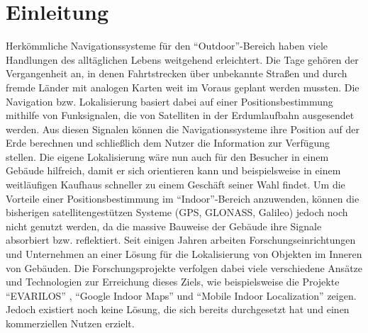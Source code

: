 \chapter{Einleitung}
Herkömmliche Navigationssysteme für den "`Outdoor"'-Bereich haben viele Handlungen des alltäglichen Lebens weitgehend erleichtert. Die Tage gehören der Vergangenheit an, in denen Fahrtstrecken über unbekannte Straßen und durch fremde Länder mit analogen Karten weit im Voraus geplant werden mussten. Die Navigation bzw. Lokalisierung basiert dabei auf einer Positionsbestimmung mithilfe von Funksignalen, die von Satelliten in der Erdumlaufbahn ausgesendet werden. Aus diesen Signalen können die Navigationssysteme ihre Position auf der Erde berechnen und schließlich dem Nutzer die Information zur Verfügung stellen. Die eigene Lokalisierung wäre nun auch für den Besucher in einem Gebäude hilfreich, damit er sich orientieren kann und beispielsweise in einem weitläufigen Kaufhaus schneller zu einem Geschäft seiner Wahl findet. Um die Vorteile einer Positionsbestimmung im "`Indoor"'-Bereich anzuwenden, können die bisherigen satellitengestützen Systeme (GPS, GLONASS, Galileo) jedoch noch nicht genutzt werden, da die massive Bauweise der Gebäude ihre Signale absorbiert bzw. reflektiert. Seit einigen Jahren arbeiten Forschungseinrichtungen und Unternehmen an einer Lösung für die Lokalisierung von Objekten im Inneren von Gebäuden. Die Forschungsprojekte verfolgen dabei viele verschiedene Ansätze und Technologien zur Erreichung dieses Ziels, wie beispielsweise die Projekte "`EVARILOS"' \cite{EVA}, "`Google Indoor Maps"' \cite{GIM} und "`Mobile Indoor Localization"' \cite{MIL} zeigen. Jedoch existiert noch keine Lösung, die sich bereits durchgesetzt hat und einen kommerziellen Nutzen erzielt.\\ \\
